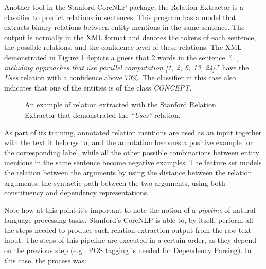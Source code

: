 \documentclass[11pt,a4paper,openright]{memoir}
\begin{document}
Another tool in the Stanford CoreNLP package, the Relation Extractor \cite{Surdeanu:2011:CIE:2021153.2021155} is a classifier to predict relations in sentences. This program has a model that extracts binary relations between entity mentions in the same sentence. The output is normally in the XML \cite{xml} format and denotes the tokens of each sentence, the possible relations, and the confidence level of these relations. The XML demonstrated in Figure \ref{fig:xml_output1} depicts a guess that 2 words in the sentence \emph{\enquote{..., including approaches that use parallel computation [1, 2, 6, 13, 24].}} have the \emph{Uses} relation with a confidence above 70\%. The classifier in this case also indicates that one of the entities is of the class \emph{CONCEPT}.

\begin{figure}[!htbp]
  \centering
    
  \caption[An example of relation extracted with the Stanford Relation Extractor.]{An example of relation extracted with the Stanford Relation Extractor that demonstrated the \emph{\enquote{Uses}} relation.}
  \label{fig:xml_output1}
\end{figure}

As part of its training, annotated relation mentions are used as an input together with the text it belongs to, and the annotation becomes a positive example for the corresponding label, while all the other possible combinations between entity mentions in the same sentence become negative examples. The feature set models the relation between the arguments by using the distance between the relation arguments, the syntactic path between the two arguments, using both constituency and dependency representations.

Note how at this point it's important to note the notion of a \emph{pipeline} of natural language processing tasks. Stanford's CoreNLP is able to, by itself, perform all the steps needed to produce such relation extraction output from the raw text input. The steps of this pipeline are executed in a certain order, as they depend on the previous step (e.g.: POS tagging is needed for Dependency Parsing). In this case, the process was:
\end{document}
